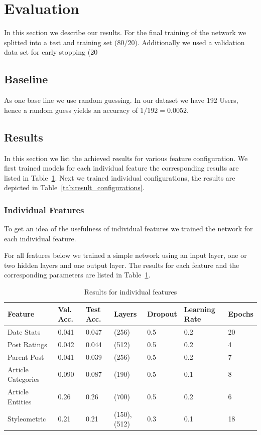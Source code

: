 \documentclass[acmsmall]{acmart}
\begin{document}
\section{Evaluation}
In this section we describe our results. For the final training of the network we splitted into a test and training set (80/20). 
Additionally we used a validation data set for early stopping (20%

\subsection{Baseline}
As one base line we use random guessing. In our dataset we have 192 Users, hence a random guess yields an accuracy of $1/192 = 0.0052$. 

\subsection{Results}
In this section we list the achieved results for various feature configuration.
We first trained models for each individual feature the corresponding results are listed in Table~\ref{tab:result_features}. 
Next we trained individual configurations, the results are depicted in Table~\ref{tab:result_configurations}.

\subsubsection{Individual Features}
To get an idea of the usefulness of individual features we trained the network for each individual feature. 

For all features below we trained a simple network using an input layer, one or two hidden layers and one output layer. 
The results for each feature and the corresponding parameters are listed in Table~\ref{tab:result_features}.

\begin{table}[H]
\begin{tabular}{lllllll}
Feature & Val. Acc. & Test Acc. & Layers & Dropout & Learning Rate & Epochs\\ \hline
Date Stats & 0.041 & 0.047 & (256) & 0.5 & 0.2 & 20 \\
Post Ratings & 0.042 & 0.044 & (512) & 0.5 & 0.2 & 4 \\
Parent Post & 0.041 & 0.039 & (256) & 0.5 & 0.2 & 7 \\
Article Categories & 0.090 & 0.087 & (190) & 0.5 & 0.1 & 8 \\
Article Entities & 0.26 & 0.26 &  (700)  & 0.5 & 0.2 & 6 \\
Styleometric & 0.21 & 0.21 & (150),(512) & 0.3 & 0.1 & 18 
\end{tabular}
\caption{Results for individual features}
\label{tab:result_features}
\end{table}
\end{document}
